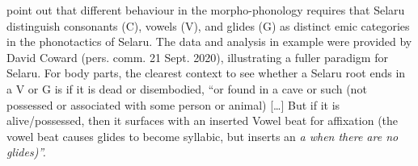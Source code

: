 


\citet{CowardCoward2000} point out that different behaviour in
the morpho-phonology requires that Selaru distinguish consonants
(C), vowels (V), and glides (G) as distinct emic categories in the phonotactics of Selaru.
The data and analysis in example  were provided by
David Coward (pers. comm. 21 Sept.
2020), illustrating a fuller paradigm for Selaru.
For body parts, the clearest context to see whether a Selaru
root ends in a V or G is if it is dead or disembodied,
“or found in a cave or such (not possessed or associated with
some person or animal) [{\ldots}] But if it is alive/possessed,
then it surfaces with an inserted Vowel beat for  affixation
(the vowel beat causes glides to become syllabic,
but inserts an \it{a} when there are no glides)”.

